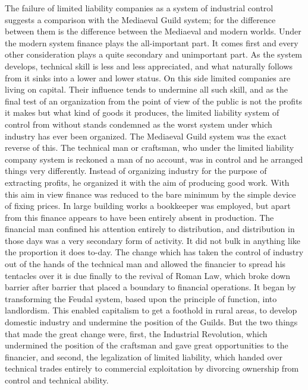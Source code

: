 \documentclass{book}
\begin{document}
The failure of limited liability companies as a system of industrial control suggests a comparison with the Mediaeval Guild system; for the difference between them is the difference between the Mediaeval and modern worlds. Under the modern system finance plays the all-important part. It comes first and every other consideration plays a quite secondary and unimportant part. As the system develops, technical skill is less and less appreciated, and what naturally follows from it sinks into a lower and lower status. On this side limited companies are living on capital. Their influence tends to undermine all such skill, and as the final test of an organization from the point of view of the public is not the profits it makes but what kind of goods it produces, the limited liability system of control from without stands condemned as the worst system under which industry has ever been organized. The Mediaeval Guild system was the exact reverse of this. The technical man or craftsman, who under the limited liability company system is reckoned a man of no account, was in control and he arranged things very differently. Instead of organizing industry for the purpose of extracting profits, he organized it with the aim of producing good work. With this aim in view finance was reduced to the bare minimum by the simple device of fixing prices. In large building works a bookkeeper was employed, but apart from this finance appears to have been entirely absent in production. The financial man confined his attention entirely to distribution, and distribution in those days was a very secondary form of activity. It did not bulk in anything like the proportion it does to-day. The change which has taken the control of industry out of the hands of the technical man and allowed the financier to spread his tentacles over it is due finally to the revival of Roman Law, which broke down barrier after barrier that placed a boundary to financial operations. It began by transforming the Feudal system, based upon the principle of function, into landlordism. This enabled capitalism to get a foothold in rural areas, to develop domestic industry and undermine the position of the Guilds. But the two things that made the great change were, first, the Industrial Revolution, which undermined the position of the craftsman and gave great opportunities to the financier, and second, the legalization of limited liability, which handed over technical trades entirely to commercial exploitation by divorcing ownership from control and technical ability.

\end{document}
